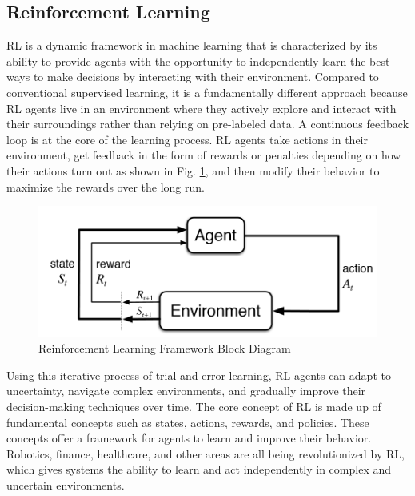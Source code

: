    \subsection{Reinforcement Learning}
        RL is a dynamic framework in machine learning that is characterized by its ability to provide agents with the opportunity to independently learn the best ways to make decisions by interacting with their environment. Compared to conventional supervised learning, it is a fundamentally different approach because RL agents live in an environment where they actively explore and interact with their surroundings rather than relying on pre-labeled data. A continuous feedback loop is at the core of the learning process. RL agents take actions in their environment, get feedback in the form of rewards or penalties depending on how their actions turn out as shown in Fig. \ref{fig:RL}, and then modify their behavior to maximize the rewards over the long run.
        \begin{figure}[H]
            \centering
            \includegraphics[width=0.9\linewidth]{Images/RL.png}
            \caption{Reinforcement Learning Framework Block Diagram \cite{RL}}
            \label{fig:RL}
    \end{figure}
        Using this iterative process of trial and error learning, RL agents can adapt to uncertainty, navigate complex environments, and gradually improve their decision-making techniques over time. The core concept of RL is made up of fundamental concepts such as states, actions, rewards, and policies. These concepts offer a framework for agents to learn and improve their behavior. Robotics, finance, healthcare, and other areas are all being revolutionized by RL, which gives systems the ability to learn and act independently in complex and uncertain environments.\clearpage
